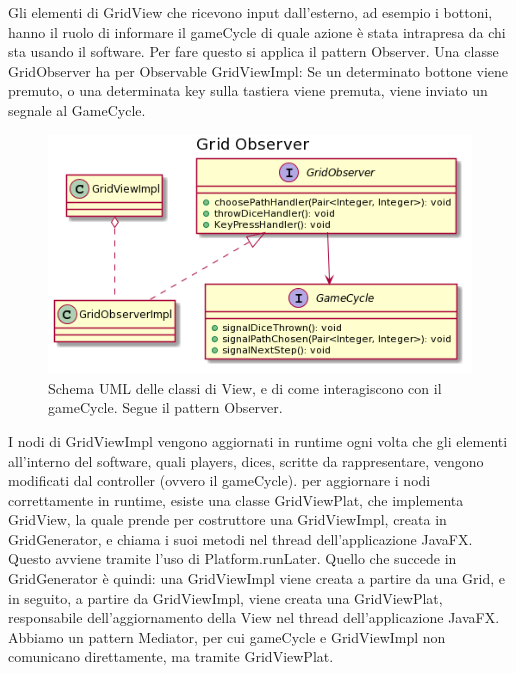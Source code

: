 \documentclass[a4paper,12pt]{report}
\begin{document}
Gli elementi di GridView che ricevono input dall’esterno, ad esempio i bottoni, hanno il ruolo di informare il gameCycle di quale azione è stata intrapresa da chi sta usando il software.
%
Per fare questo si applica il pattern Observer.
%
Una classe GridObserver ha per Observable GridViewImpl: Se un determinato bottone viene premuto, o una determinata key sulla tastiera viene premuta, viene inviato un segnale al GameCycle.

\begin{figure}[!t]
\centering{}
\includegraphics[width=\textwidth]{images/miriana/grid_observer.png}
\caption{Schema UML delle classi di View, e di come interagiscono con il gameCycle. Segue il pattern Observer.}
\label{img:gridobserver}
\end{figure}

I nodi di GridViewImpl vengono aggiornati in runtime ogni volta che gli elementi all’interno del software, quali players, dices, scritte da rappresentare, vengono modificati dal controller (ovvero il gameCycle).
%
per aggiornare i nodi correttamente in runtime, esiste una classe GridViewPlat, che implementa GridView, la quale prende per costruttore una GridViewImpl, creata in GridGenerator, e chiama i suoi metodi nel thread dell’applicazione JavaFX.
%
Questo avviene tramite l’uso di Platform.runLater.
%
Quello che succede in GridGenerator è quindi: una GridViewImpl viene creata a partire da una Grid, e in seguito, a partire da GridViewImpl, viene creata una GridViewPlat, responsabile dell’aggiornamento della View nel thread dell’applicazione JavaFX.
%
Abbiamo un pattern Mediator, per cui gameCycle e GridViewImpl non comunicano direttamente, ma tramite GridViewPlat.
\end{document}
